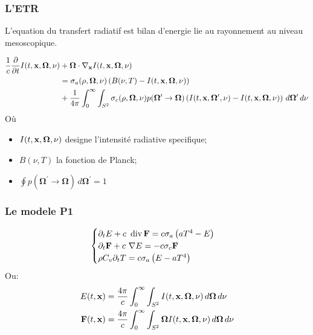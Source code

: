 \begin{frame}
  \frametitle{L'ETR}
  L'equation du transfert radiatif est bilan d'energie lie au rayonnement au niveau mesoscopique. 

  \begingroup
  \scriptsize
  \begin{gather*}
      \begin{aligned}
      \frac{1}{c} \frac{\partial}{\partial t}I(t,\mathbf{x},\bm{\Omega},\nu) &+\bm{\Omega}\cdot\nabla_{\mathbf{x}} I(t,\mathbf{x},\bm{\Omega},\nu) \\
      &= \sigma_a(\rho,\bm{\Omega},\nu)\left(B(\nu,T)-I(t,\mathbf{x},\bm{\Omega},\nu)\right) \\
      &+ \frac{1}{4\pi} \int_{0}^{\infty} \int_{S^2}\sigma_c(\rho,\bm{\Omega},\nu)p(\bm{\Omega}^\prime\rightarrow\bm{\Omega})\left(I(t,\mathbf{x},\bm{\Omega}^\prime,\nu)-I(t,\mathbf{x},\bm{\Omega},\nu)\right) \, d\bm{\Omega}^\prime \, d\nu
      \end{aligned}
  \end{gather*}
  \endgroup
Où 
\begin{itemize}
  \item $I(t,\mathbf{x},\bm{\Omega},\nu)$ designe l'intensité radiative specifique;
  \item $B(\nu,T)$ la fonction de Planck;
  \item $\oint p(\bm{\Omega}^\prime\rightarrow\bm{\Omega})\, d\bm{\Omega}^\prime=1$
\end{itemize}

\end{frame}

\begin{frame}
  \frametitle{Le modele P1}
  \begingroup
  \large
  \begin{equation*}
      \begin{cases}
       \partial_tE + c \ \operatorname {div} \mathbf{F} = c\sigma_a\left(aT^4-E\right)\\
       \partial_t\mathbf{F} + c \ \nabla E = -c\sigma_c \mathbf{F} \\
       \rho C_v \partial_t T = c \sigma_a \left(E-aT^4\right)
      \end{cases}
  \end{equation*}
  \endgroup
Ou:   %
\begin{align*}
  E(t,\mathbf{x}) &= \frac{4\pi}{c} \int_{0}^{\infty} \int_{S^2} I(t,\mathbf{x},\bm{\Omega},\nu) \, d\bm{\Omega} \, d\nu \\
  \mathbf{F}(t,\mathbf{x}) &= \frac{4\pi}{c} \int_{0}^{\infty} \int_{S^2} \bm{\Omega}I(t,\mathbf{x},\bm{\Omega},\nu) \, d\bm{\Omega} \, d\nu 
\end{align*}

\end{frame}

